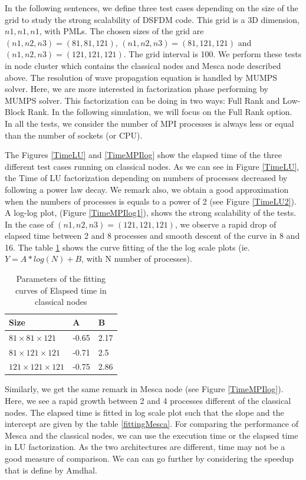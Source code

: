 In the following sentences, we define three test cases depending on the size of the grid to study the strong scalability of DSFDM code. This grid is a 3D dimension, $n1, n1, n1$, with PMLs. The chosen sizes of the grid are  $(n1,n2,n3)=(81,81,121)$,  $(n1,n2,n3)=(81,121,121)$ and $(n1,n2,n3)=(121,121,121)$. The grid interval is 100. We perform these tests in node cluster which contains the classical nodes and Mesca node described above. The resolution of wave propagation equation is handled by MUMPS solver. Here, we are more interested in factorization phase performing by MUMPS solver. This factorization can be doing in two ways: Full Rank and Low-Block Rank. In the following simulation, we will focus on the Full Rank option. In all the tests, we consider the number of MPI processes is always less or equal than the number of sockets (or CPU). 

The Figures \ref{TimeLU} and \ref{TimeMPIlog} show the elapsed time of the three different test cases running on classical nodes. As we can see in Figure \ref{TimeLU}, the Time of LU factorization depending on numbers of processes decreased by following a power law decay. We remark also, we obtain a good approximation when the numbers of processes is equals to a power of 2 (see Figure \ref{TimeLU2}). A log-log plot, (Figure \ref{TimeMPIlog1}), shows the strong scalability of the tests. In the case of $(n1,n2,n3)=(121,121,121)$, we observe a rapid drop of elapsed time between 2 and 8 processes and smooth descent of the curve in 8 and 16. The table \ref{fitting} shows the curve fitting of the the log scale plots (ie. $ Y= A*log(N)+B $, with N number of processes).

\begin{table}[!h]
\centering
\begin{tabular}{l|l|l}
Size & A & B  \\
 \hline
$81 \times 81 \times 121$ & -0.65 & 2.17	 \\
 $81 \times 121 \times 121$ & -0.71 & 2.5 \\
$ 121 \times 121 \times 121$ &  -0.75 & 2.86 

\end{tabular}
\caption{Parameters of the fitting curves of Elapsed time in classical nodes}
\label{fitting}
\end{table}

Similarly, we get the same remark in Mesca node (see Figure \ref{TimeMPIlog}). Here, we see a rapid growth between 2 and 4 processes different of the classical nodes. The elapsed time is fitted in log scale plot such that the slope and the intercept are given by the table \ref{fittingMesca}. For comparing the performance of Mesca and the classical nodes, we can use the execution time or the elapsed time in LU factorization. As the two architectures are different,   time may not be a good measure of comparison. We can can go further by considering the speedup that is define by Amdhal.

